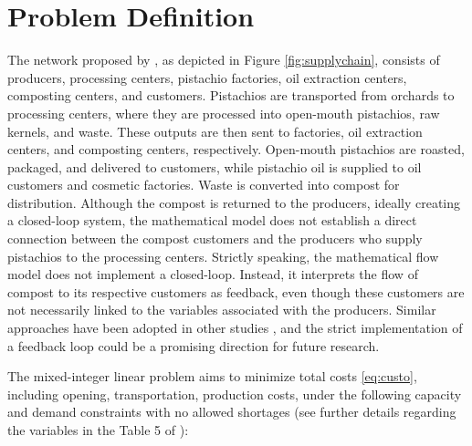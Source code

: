 \documentclass[a4paper]{ifacconf}
\begin{document}


\section{Problem Definition}
\label{sec:problem-def}

The network proposed by \cite{rajabi2023utilizing}, as depicted in Figure \ref{fig:supplychain}, consists of producers, processing centers, pistachio factories, oil extraction centers, composting centers, and customers. Pistachios are transported from orchards to processing centers, where they are processed into open-mouth pistachios, raw kernels, and waste. These outputs are then sent to factories, oil extraction centers, and composting centers, respectively. Open-mouth pistachios are roasted, packaged, and delivered to customers, while pistachio oil is supplied to oil customers and cosmetic factories. Waste is converted into compost for distribution. Although the compost is returned to the producers, ideally creating a closed-loop system, the mathematical model does not establish a direct connection between the compost customers and the producers who supply pistachios to the processing centers. Strictly speaking, the mathematical flow model does not implement a closed-loop. Instead, it interprets the flow of compost to its respective customers as feedback, even though these customers are not necessarily linked to the variables associated with the producers. Similar approaches have been adopted in other studies \citep{pishvaee2010memetic,ahmadi2019integrated,banasik2016simple}, and the strict implementation of a feedback loop could be a promising direction for future research.

The mixed-integer linear problem aims to minimize total costs \eqref{eq:custo}, including opening, transportation, production costs, under the following capacity and demand constraints 
with no allowed shortages (see further details regarding the variables in the Table 5 of \cite{rajabi2023utilizing}):
    
\end{document}
